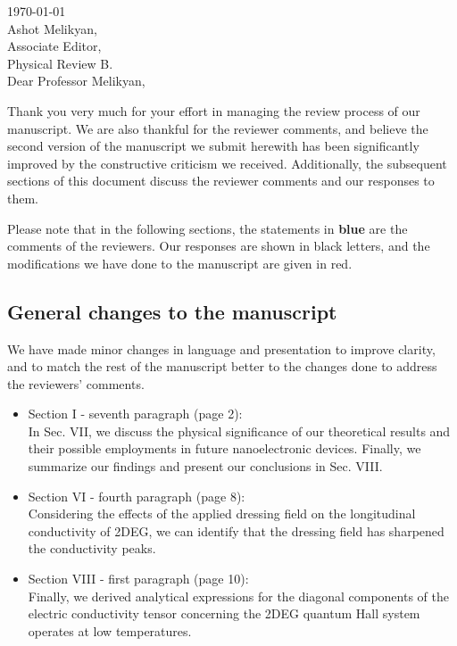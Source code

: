 \documentclass{article}
\begin{document}

\today\\

Ashot Melikyan,\\
Associate Editor,\\
Physical Review B.\\

Dear Professor Melikyan,

Thank you very much for your effort in managing the review process of our manuscript. We are also thankful for the reviewer comments, and believe the second version of the manuscript we submit herewith has been significantly improved by the constructive criticism we received. Additionally, the subsequent sections of this document discuss the reviewer comments and our responses to them.

Please note that in the following sections, the statements in {\color{RoyalBlue} \textbf{blue}} are the comments of the reviewers. Our responses are shown in black letters, and the modifications we have done to the manuscript are given in {\color{Red} red}.

\subsection*{General changes to the manuscript}


We have made minor changes in language and presentation to improve clarity, and to match the rest of the manuscript better to the changes done to address the reviewers' comments.
\begin{itemize}
    \item Section I - seventh paragraph (page 2): \\
        {\color{Red} In Sec. VII, we discuss the physical significance of our theoretical results and their possible employments in future nanoelectronic devices.
        Finally, we summarize our findings and present our conclusions in Sec. VIII.}
    \item Section VI - fourth paragraph (page 8): \\
        {\color{Red} Considering the effects of the applied dressing field on the longitudinal conductivity of 2DEG, we can identify that the dressing field has sharpened the conductivity peaks.}
    \item Section VIII - first paragraph (page 10): \\
        {\color{Red} Finally, we derived analytical expressions for the diagonal components of the electric conductivity tensor concerning the 2DEG quantum Hall system operates at low temperatures.}
\end{itemize}
\end{document}

